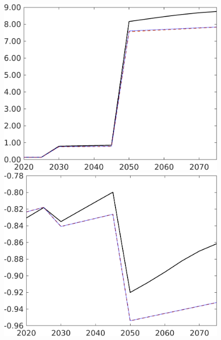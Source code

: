 \begin{figure}[h!!]
\begin{minipage}[]{0.32\textwidth}
	\end{minipage}
	\begin{minipage}[]{0.32\textwidth}
		\includegraphics[width=1\textwidth]{../../codding_model/own_basedOnFried/optimalPol_190722_tidiedUp/figures/all_July22/GFF_DDCompEffOPT_T_NoTaus_pol4_spillover0_noskill0_sep1_xgrowth0_etaa0.79_lgd0_lff0.png}
	\end{minipage}
	\begin{minipage}[]{0.32\textwidth}
		\includegraphics[width=1\textwidth]{../../codding_model/own_basedOnFried/optimalPol_190722_tidiedUp/figures/all_July22/SWF_DDCompEffOPT_T_NoTaus_pol4_spillover0_noskill0_sep1_xgrowth0_etaa0.79_lgd0_lff0.png}

\end{minipage}
\end{figure}

